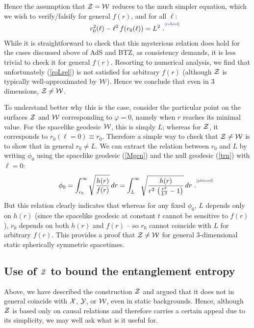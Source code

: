 \documentclass[12pt]{article}
\def\req#1{(\ref{#1})}
\def\({\left (}
\def\){\right )}
\def\ph{\varphi}
\def\l{\ell}
\def\CW{{\cal W}}
\def\CX{{\cal X}}
\def\CY{{\cal Y}}
\def\CZ{{\cal Z}}
\def\l{\ell}
\def\Label#1{\label{#1}%
{ \color{blue}{\smash{\hbox to0pt{\raise2ex\hbox{\tiny[#1]}\hss}}}}}
\def\Gms{\CW}
\def\Lms{\CY}
\def\Xms{\CX}
\def\Cms{\CZ}
\def\pho{\phi_0}
\def\ro{r_0}
\begin{document}
Hence the assumption that $\Cms=\Gms$ reduces to the much simpler equation, which we wish to verify/falsify for general $f(r)$, and for all $\l$:
%
\begin{equation}
\ro^2(\l) - \l^2 \,  f(\ro(\l) ) = L^2 \ .
\Label{roLrel}
\end{equation}
%
While it is straightforward to check that this mysterious relation does hold for the cases discussed above of AdS and BTZ, as consistency demands, it is less trivial to check it for general $f(r)$.
Resorting to numerical analysis, we find that unfortunately \req{roLrel} is not satisfied for arbitrary $f(r)$ (although $\Cms$ is typically well-approximated by $\Gms$).  Hence we conclude that even in 3 dimensions, $\Cms \ne \Gms$.

To understand better why this is the case, consider the particular point on the surfaces $\Cms$ and $\Gms$ corresponding to $\ph=0$, namely when $r$ reaches its minimal value.  For the spacelike geodesic $\Gms$, this is simply $L$; whereas for $\Cms$, it corresponds to $\ro(\l=0) \equiv \ro$.  Therefore a simple way to check that $\Cms \ne \Gms$ is to show that in general $\ro \ne L$.
We can extract the relation between $\ro$ and $L$ by writing $\pho$ using the spacelike geodesic \req{Mgen} and the null geodesic \req{trn} with $\l=0$:
%
\begin{equation}
\pho
= \int_{\ro}^{\infty}  \sqrt{{h(r)  \over f(r) }} \, dr
= \int_{L}^{\infty}  \sqrt{{h(r)  \over r^2 \, \({r^2 \over L^2} - 1 \) }} \, dr  \ .
\Label{phiorel}
\end{equation}
%
But this relation clearly indicates that whereas for any fixed $\pho$, $L$ depends only on $h(r)$ (since the spacelike geodesic at constant $t$ cannot be sensitive to $f(r)$), $\ro$ depends on both $h(r)$ and $f(r)$ -- so $\ro$ cannot coincide with $L$ for arbitrary $f(r)$.  This provides a proof that $\Cms \ne \Gms$ for general 3-dimensional static spherically symmetric spacetimes.

\subsection{Use of $\Cms$ to bound the entanglement entropy}

Above, we have described the construction $\Cms$ and argued that it does
not in general coincide with $\Xms$, $\Lms$, or $\Gms$, even in static backgrounds.
Hence, although  $\Cms$ is based only on causal relations and therefore carries a
certain appeal due to its simplicity, we may well ask what is it useful for.
\end{document}
